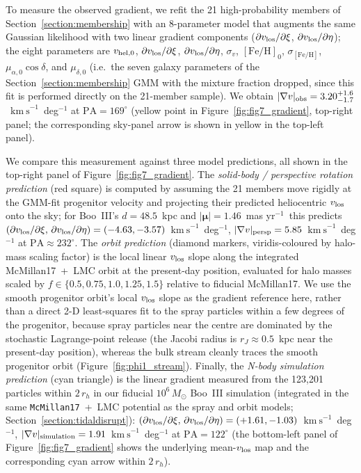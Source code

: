\documentclass[twocolumn, apj, numberedappendix, appendixfloats]{openjournal_dhayaa}
\newcommand{\vlosUnits}{$\mathrm{km~s}^{-1}$\xspace}
\newcommand{\pmUnits}{mas yr$^{-1}$\xspace}
\begin{document}
To measure the observed gradient, we refit the 21 high-probability members of Section~\ref{section:membership} with an 8-parameter model that augments the same Gaussian likelihood with two linear gradient components ($\partial v_{\rm los}/\partial\xi$, $\partial v_{\rm los}/\partial\eta$); the eight parameters are $v_{\rm hel,0}$, $\partial v_{\rm los}/\partial\xi$, $\partial v_{\rm los}/\partial\eta$, $\sigma_v$, $[\mathrm{Fe/H}]_0$, $\sigma_{[\mathrm{Fe/H}]}$, $\mu_{\alpha,0}\cos\delta$, and $\mu_{\delta,0}$ (i.e.\ the seven galaxy parameters of the Section~\ref{section:membership} GMM with the mixture fraction dropped, since this fit is performed directly on the 21-member sample). We obtain $|\nabla v|_{\rm obs} = 3.20^{+1.6}_{-1.7}$~\vlosUnits~deg$^{-1}$ at $\mathrm{PA} = 169^\circ$ (yellow point in Figure~\ref{fig:fig7_gradient}, top-right panel; the corresponding sky-panel arrow is shown in yellow in the top-left panel).

We compare this measurement against three model predictions, all shown in the top-right panel of Figure~\ref{fig:fig7_gradient}. The \emph{solid-body / perspective rotation prediction} (red square) is computed by assuming the 21 members move rigidly at the GMM-fit progenitor velocity and projecting their predicted heliocentric $v_{\rm los}$ onto the sky; for Boo~III's $d = 48.5$~kpc and $|\boldsymbol{\mu}| = 1.46$~\pmUnits\ this predicts $(\partial v_{\rm los}/\partial\xi,\,\partial v_{\rm los}/\partial\eta) = (-4.63, -3.57)$~\vlosUnits~deg$^{-1}$, $|\nabla v|_{\rm persp} = 5.85$~\vlosUnits~deg$^{-1}$ at $\mathrm{PA} \approx 232^\circ$. The \emph{orbit prediction} (diamond markers, viridis-coloured by halo-mass scaling factor) is the local linear $v_{\rm los}$ slope along the integrated McMillan17~+~LMC orbit at the present-day position, evaluated for halo masses scaled by $f \in \{0.5, 0.75, 1.0, 1.25, 1.5\}$ relative to fiducial McMillan17. We use the smooth progenitor orbit's local $v_{\rm los}$ slope as the gradient reference here, rather than a direct 2-D least-squares fit to the spray particles within a few degrees of the progenitor, because spray particles near the centre are dominated by the stochastic Lagrange-point release (the Jacobi radius is $r_J \approx 0.5$~kpc near the present-day position), whereas the bulk stream cleanly traces the smooth progenitor orbit (Figure~\ref{fig:phi1_stream}). Finally, the \emph{N-body simulation prediction} (cyan triangle) is the linear gradient measured from the 123{,}201 particles within $2\,r_h$ in our fiducial $10^6\,M_\odot$ Boo~III simulation (integrated in the same \texttt{McMillan17}~+~LMC potential as the spray and orbit models; Section~\ref{section:tidaldisrupt}): $(\partial v_{\rm los}/\partial\xi,\,\partial v_{\rm los}/\partial\eta) = (+1.61, -1.03)$~\vlosUnits~deg$^{-1}$, $|\nabla v|_{\rm simulation} = 1.91$~\vlosUnits~deg$^{-1}$ at $\mathrm{PA} = 122^\circ$ (the bottom-left panel of Figure~\ref{fig:fig7_gradient} shows the underlying mean-$v_{\rm los}$ map and the corresponding cyan arrow within $2\,r_h$).
\end{document}
